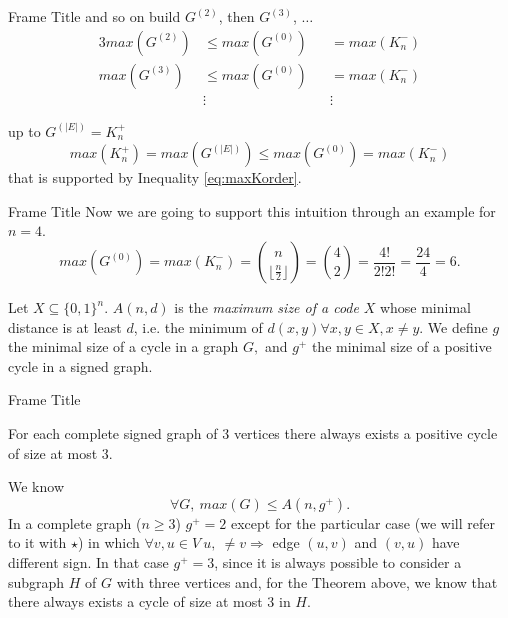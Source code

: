 \documentclass{beamer}
\newcommand{\floor}[1]{\lfloor #1 \rfloor}
\begin{document}
\begin{frame}{Frame Title}
    and so on build $G^{(2)}$, then $G^{(3)}$, $\dots$
    \begin{alignat*}{3}
        max(G^{(2)}) &\leq max(G^{(0)}) &&= max(K_n^-)\\
        max(G^{(3)}) &\leq max(G^{(0)}) &&= max(K_n^-)\\
        &\vdots && \vdots 
    \end{alignat*}
        
    up to $G^{(|E|)} = K_n^+$
    \[
        max(K_n^+) = max(G^{(|E|)}) \leq max(G^{(0)}) = max(K_n^-)
    \]
    that is supported by Inequality \ref{eq:maxKorder}.
\end{frame}

\begin{frame}

\end{frame}

\begin{frame}{Frame Title}
    \justifying
    Now we are going to support this intuition through an example for $n=4$.
    \[
        max(G^{(0)}) = max(K_n^-) = \binom{n}{\floor{\frac{n}{2}}} = \binom{4}{2} = \frac{4!}{2!2!} = \frac{24}{4} = 6.
    \]
    
\end{frame}

\begin{frame}
    \begin{definition}
        \justifying
        Let $X \subseteq \{0,1\}^n$. $A(n,d)$ is the \textit{maximum size of a code} $X$ whose minimal distance is at least $d$, i.e. the minimum of $d(x,y) \forall x,y \in X, x\neq y.$ We define $g$ the minimal size of a cycle in a graph $G,$ and $g^+$ the minimal size of a positive cycle in a signed graph. 
    \end{definition}
\end{frame}

\begin{frame}{Frame Title}
    \justifying
    \begin{theorem}
    \justifying
    For each complete signed graph of 3 vertices there always exists a positive cycle of size at most 3.
    \end{theorem}
    We know 
    \[
        \forall G,\ max(G) \leq A(n,g^+).
    \]
    In a complete graph ($n \geq 3$) $g^+ = 2$ except for the particular case (we will refer to it with $\star$) in which $\forall v,u \in V\ u,\ \neq v \Rightarrow$ edge $(u,v)$ and $(v,u)$ have different sign. In that case $g^+ = 3$, since it is always possible to consider a subgraph $H$ of $G$ with three vertices and, for the Theorem above, we know that there always exists a cycle of size at most 3 in $H$.
\end{frame}
\end{document}
